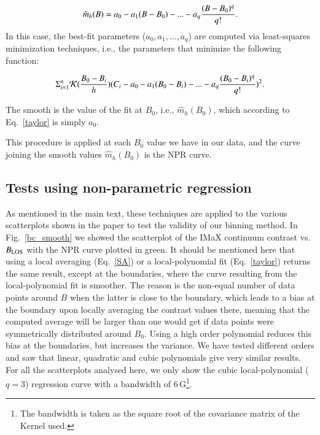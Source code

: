 \documentclass[goettingen, gauss, print]{thesis}
\begin{document}
\begin{equation}
\hat{m}_h(B) = a_0-a_1(B-B_0)-...-a_q\frac{(B-B_0)^q}{q!}\\.
\label{taylor}
\end{equation} 
In this case, the best-fit parameters ($a_0, a_1,...,a_q$) are computed via least-squares minimization techniques, i.e., the parameters that minimize the following function: 

\begin{equation}
\Sigma_{i=1}^{n} \mathcal{K}(\frac{B_0-B_i}{h})(C_i-a_0-a_1(B_0-B_i)-...-a_q\frac{(B_0-B_i)^q}{q!})^2 \\.
\label{LPq}
\end{equation}


The smooth is the value of the fit at $B_0$, i.e., $\hat{m}_h(B_0)$, which according to Eq.~\ref{taylor} is simply $a_0$. 

This procedure is applied at each $B_0$ value we have in our data, and the curve joining the smooth values $\hat{m}_h(B_0)$ is the NPR curve.

\subsection{Tests using non-parametric regression}
\label{npr_tests}
As mentioned in the main text, these techniques are applied to the various scatterplots shown in the paper to test the validity of our binning method. In Fig.~\ref{bc_smooth} we showed the scatterplot of the IMaX continuum contrast vs. $B_{\rm LOS}$ with the NPR curve plotted in green. It should be mentioned here that using a local averaging (Eq.~\ref{SA}) or a local-polynomial fit (Eq.~\ref{taylor}) returns the same result, except at the boundaries, where the curve resulting from the local-polynomial fit is smoother. The reason is the non-equal number of data points around $B$ when the latter is close to the boundary, which leads to a bias at the boundary upon locally averaging the contrast values there, meaning that the computed average will be larger than one would get if data points were symmetrically distributed around $B_0$. Using a high order polynomial reduces this bias at the boundaries, but increases the variance. 
We have tested different orders and saw that linear, quadratic and cubic polynomials give very similar results. For all the scatterplots analysed here, we only show the cubic local-polynomial ($q=3$) regression curve with a bandwidth of 6\,G\footnote{The bandwidth is taken as the square root of the covariance matrix of the Kernel used.}.
\\
\end{document}
